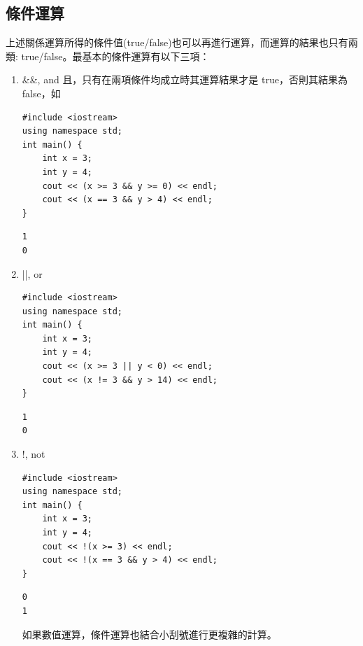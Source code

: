 \documentclass[a4paper,12pt]{article}
\begin{document}
\subsection{條件運算}
\label{sec:orgfdaba84}
上述關係運算所得的條件值(true/false)也可以再進行運算，而運算的結果也只有兩類: true/false。最基本的條件運算有以下三項：\\
\begin{enumerate}
\item \&\&, and
\label{sec:org85b4e5a}
且，只有在兩項條件均成立時其運算結果才是 true，否則其結果為 false，如\\
\lstset{breaklines=true,language=cpp,label= ,caption= ,captionpos=b,firstnumber=1,numbers=left}
\begin{lstlisting}
#include <iostream>
using namespace std;
int main() {
    int x = 3;
    int y = 4;
    cout << (x >= 3 && y >= 0) << endl;
    cout << (x == 3 && y > 4) << endl;
}
\end{lstlisting}

\begin{verbatim}
1
0
\end{verbatim}

\item ||, or
\label{sec:orgd84c92e}
\lstset{breaklines=true,language=cpp,label= ,caption= ,captionpos=b,firstnumber=1,numbers=left}
\begin{lstlisting}
#include <iostream>
using namespace std;
int main() {
    int x = 3;
    int y = 4;
    cout << (x >= 3 || y < 0) << endl;
    cout << (x != 3 && y > 14) << endl;
}
\end{lstlisting}

\begin{verbatim}
1
0
\end{verbatim}

\item !, not
\label{sec:orgb585119}
\lstset{breaklines=true,language=cpp,label= ,caption= ,captionpos=b,firstnumber=1,numbers=left}
\begin{lstlisting}
#include <iostream>
using namespace std;
int main() {
    int x = 3;
    int y = 4;
    cout << !(x >= 3) << endl;
    cout << !(x == 3 && y > 4) << endl;
}
\end{lstlisting}

\begin{verbatim}
0
1
\end{verbatim}


如果數值運算，條件運算也結合小刮號進行更複雜的計算。\\
\end{enumerate}
\end{document}
